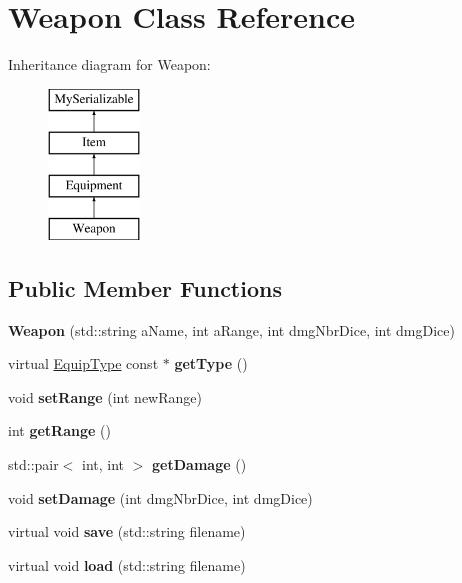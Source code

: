 \hypertarget{class_weapon}{}\section{Weapon Class Reference}
\label{class_weapon}
Inheritance diagram for Weapon\+:\begin{figure}[H]
\begin{center}
\leavevmode
\includegraphics[height=4.000000cm]{class_weapon}
\end{center}
\end{figure}
\subsection*{Public Member Functions}
\begin{DoxyCompactItemize}
\item 
\hypertarget{class_weapon_ae785e31744d4b8dd60218673d1bca9f1}{}\label{class_weapon_ae785e31744d4b8dd60218673d1bca9f1} 
{\bfseries Weapon} (std\+::string a\+Name, int a\+Range, int dmg\+Nbr\+Dice, int dmg\+Dice)
\item 
\hypertarget{class_weapon_a6b9a83e88b0d07a52ac605bd0044b26a}{}\label{class_weapon_a6b9a83e88b0d07a52ac605bd0044b26a} 
virtual \hyperlink{class_equip_type}{Equip\+Type} const  $\ast$ {\bfseries get\+Type} ()
\item 
\hypertarget{class_weapon_a2014e6757365a58d5d7815a717903347}{}\label{class_weapon_a2014e6757365a58d5d7815a717903347} 
void {\bfseries set\+Range} (int new\+Range)
\item 
\hypertarget{class_weapon_af0d86939f16add54fc7ae87fea85ac21}{}\label{class_weapon_af0d86939f16add54fc7ae87fea85ac21} 
int {\bfseries get\+Range} ()
\item 
\hypertarget{class_weapon_a1cc1f450354d475f7e0fe67aa9295033}{}\label{class_weapon_a1cc1f450354d475f7e0fe67aa9295033} 
std\+::pair$<$ int, int $>$ {\bfseries get\+Damage} ()
\item 
\hypertarget{class_weapon_a590ffd68bf9a01c9975a9f34428c3f36}{}\label{class_weapon_a590ffd68bf9a01c9975a9f34428c3f36} 
void {\bfseries set\+Damage} (int dmg\+Nbr\+Dice, int dmg\+Dice)
\item 
\hypertarget{class_weapon_ae382102dd74948449b7eadbb2f24bc06}{}\label{class_weapon_ae382102dd74948449b7eadbb2f24bc06} 
virtual void {\bfseries save} (std\+::string filename)
\item 
\hypertarget{class_weapon_a541515ce9e8394c01473dd4282cc1dfe}{}\label{class_weapon_a541515ce9e8394c01473dd4282cc1dfe} 
virtual void {\bfseries load} (std\+::string filename)
\end{DoxyCompactItemize}
